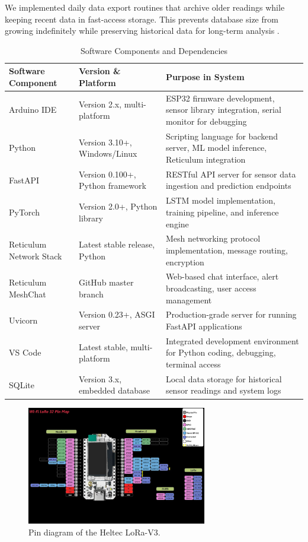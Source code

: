 We implemented daily data export routines that archive older readings while keeping recent data in fast-access storage. This prevents database size from growing indefinitely while preserving historical data for long-term analysis \cite{owens2006definitive}.

\begin{table}[H]
\centering
\caption{Software Components and Dependencies}
\label{tab:software_components}
\begin{tabular}{|p{3.5cm}|p{5cm}|p{6.5cm}|}
\hline
\textbf{Software Component} & \textbf{Version \& Platform} & \textbf{Purpose in System} \\
\hline
Arduino IDE & Version 2.x, multi-platform & ESP32 firmware development, sensor library integration, serial monitor for debugging \\
\hline
Python & Version 3.10+, Windows/Linux & Scripting language for backend server, ML model inference, Reticulum integration \\
\hline
FastAPI & Version 0.100+, Python framework & RESTful API server for sensor data ingestion and prediction endpoints \\
\hline
PyTorch & Version 2.0+, Python library & LSTM model implementation, training pipeline, and inference engine \\
\hline
Reticulum Network Stack & Latest stable release, Python & Mesh networking protocol implementation, message routing, encryption \\
\hline
Reticulum MeshChat & GitHub master branch & Web-based chat interface, alert broadcasting, user access management \\
\hline
Uvicorn & Version 0.23+, ASGI server & Production-grade server for running FastAPI applications \\
\hline
VS Code & Latest stable, multi-platform & Integrated development environment for Python coding, debugging, terminal access \\
\hline
SQLite & Version 3.x, embedded database & Local data storage for historical sensor readings and system logs \\
\hline
\end{tabular}
\end{table}

\begin{figure}[H]         %
  \centering
  \includegraphics[width=0.7\textwidth]{heltecPinDiagram.jpg}
  \caption{Pin diagram of the Heltec LoRa-V3.}
  \label{fig:heltec-pin}
\end{figure}
